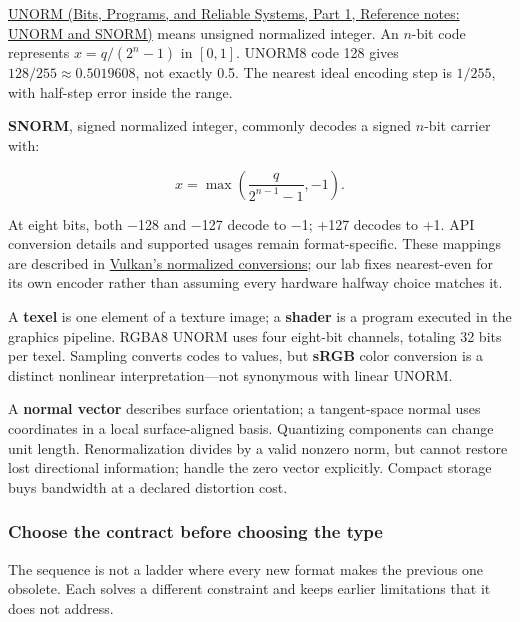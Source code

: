 \href{../01-Bits-Programs-and-Reliable-Systems-P01/main.pdf\#appendix-b2402c453dac}{UNORM (Bits, Programs, and Reliable Systems, Part 1, Reference notes: UNORM and SNORM)} means unsigned normalized integer. An \(n\)-bit code represents \(x=q/(2^n-1)\) in \([0,1]\). UNORM8 code 128 gives \(128/255\approx0.5019608\), not exactly 0.5. The nearest ideal encoding step is \(1/255\), with half-step error inside the range.

\textbf{SNORM}, signed normalized integer, commonly decodes a signed \(n\)-bit carrier with:

\[
x=\max\!\left(\frac{q}{2^{n-1}-1},-1\right).
\]

At eight bits, both −128 and −127 decode to −1; +127 decodes to +1. API conversion details and supported usages remain format-specific. These mappings are described in \href{https://docs.vulkan.org/spec/latest/chapters/fundamentals.html\#fundamentals-fixedfpconv}{Vulkan's normalized conversions}; our lab fixes nearest-even for its own encoder rather than assuming every hardware halfway choice matches it.

A \textbf{texel} is one element of a texture image; a \textbf{shader} is a program executed in the graphics pipeline. RGBA8 UNORM uses four eight-bit channels, totaling 32 bits per texel. Sampling converts codes to values, but \textbf{sRGB} color conversion is a distinct nonlinear interpretation---not synonymous with linear UNORM.

A \textbf{normal vector} describes surface orientation; a tangent-space normal uses coordinates in a local surface-aligned basis. Quantizing components can change unit length. Renormalization divides by a valid nonzero norm, but cannot restore lost directional information; handle the zero vector explicitly. Compact storage buys bandwidth at a declared distortion cost.

\subsubsection{Choose the contract before choosing the type}\label{05-engine-i-ch001-choose-the-contract-before-choosing-the-type}

\hypertarget{05-engine-i-ch001-choose-the-contract-before-choosing-the-type}{}

The sequence is not a ladder where every new format makes the previous one obsolete. Each solves a different constraint and keeps earlier limitations that it does not address.

